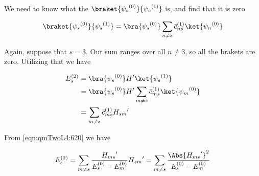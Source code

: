 We need to know what the $\braket{{\psi_s}^{(0)}}{{\psi_s}^{(1)}}$ is, and find that it is zero

\begin{equation}\label{eqn:qmTwoL4:660}
\braket{{\psi_s}^{(0)}}{{\psi_s}^{(1)}}
=
\bra{{\psi_s}^{(0)}}
\sum_{n \ne s} {\bar{c}_{ns}}^{(1)} \ket{{\psi_n}^{(0)}}
\end{equation}

Again, suppose that $s = 3$.  Our sum ranges over all $n \ne 3$, so all the brakets are zero.  Utilizing that we have

\begin{align*}
E_s^{(2)} 
&=
\bra{{\psi_s}^{(0)}} H' \ket{{\psi_s}^{(1)}}  \\
&=
\bra{{\psi_s}^{(0)}} H' \sum_{m \ne s} {\bar{c}_{ms}}^{(1)} \ket{{\psi_m}^{(0)}} \\
&=
\sum_{m \ne s} {\bar{c}_{ms}}^{(1)} {H_{sm}}'
\end{align*}

From \ref{eqn:qmTwoL4:620} we have

\begin{equation}\label{eqn:qmTwoL4:n}
E_s^{(2)} 
=
\sum_{m \ne s} 
\frac{{H_{ms}}' }
{ E_s^{(0)} - E_m^{(0)} }
{H_{sm}}'
=
\sum_{m \ne s} 
\frac{\Abs{{H_{ms}}'}^2 }
{ E_s^{(0)} - E_m^{(0)} }
\end{equation}

\EndArticle
